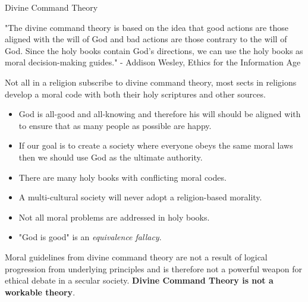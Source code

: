 \documentclass[]{../../DefinitionFormat}
\begin{document}
\begin{definition}{Divine Command Theory}
	\begin{summary}
		"The divine command theory is based on the idea that good actions are those aligned
		with the will of God and bad actions are those contrary to the will of God. Since the holy
		books contain God’s directions, we can use the holy books as moral decision-making
		guides." - Addison Wesley, Ethics for the Information Age
	\end{summary}
	
	\par Not all in a religion subscribe to divine command theory, most sects in religions develop a moral code with both their holy scriptures and other sources.
	
	\renewcommand{\labelitemi}{$+$}
	\begin{itemize}
		\item God is all-good and all-knowing and therefore his will should be aligned with to ensure that as many people as possible are happy.
		\item If our goal is to create a society where everyone obeys the same moral laws then we should use God as the ultimate authority.
	\end{itemize}
	\renewcommand{\labelitemi}{$-$}
	\begin{itemize}
		\item There are many holy books with conflicting moral codes.
		\item A multi-cultural society will never adopt a religion-based morality.
		\item Not all moral problems are addressed in holy books.
		\item "God is good" is an \textit{equivalence fallacy}.
	\end{itemize}
	
	\par Moral guidelines from divine command theory are not a result of logical progression from underlying principles and is therefore not a powerful weapon for ethical debate in a secular society. \textbf{Divine Command Theory is not a workable theory}.
\end{definition}
\end{document}
